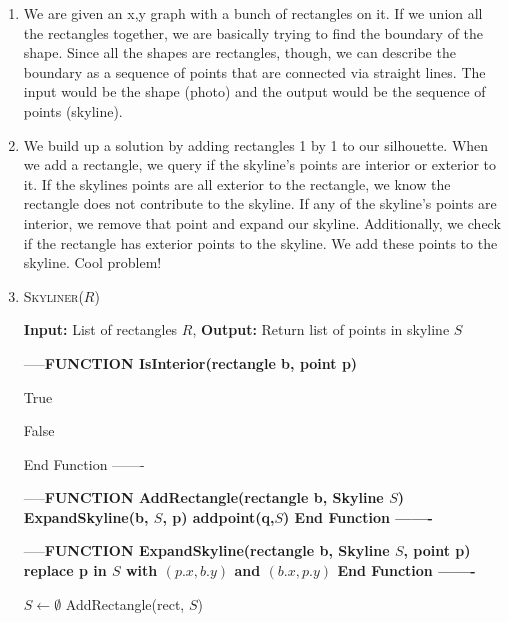 \documentclass{article}
\begin{document}
\begin{enumerate}
	\item We are given an x,y graph with a bunch of rectangles on it. If we union all the rectangles together, we are basically trying to find the boundary of the shape. Since all the shapes are rectangles, though, we can describe the boundary as a sequence of points that are connected via straight lines. The input would be the shape (photo) and the output would be the sequence of points (skyline). 
	\item We build up a solution by adding rectangles 1 by 1 to our silhouette. When we add a rectangle, we query if the skyline's points are interior or exterior to it. If the skylines points are all exterior to the rectangle, we know the rectangle does not contribute to the skyline. If any of the skyline's points are interior, we remove that point and expand our skyline. Additionally, we check if the rectangle has exterior points to the skyline. We add these points to the skyline.  Cool problem!
	\item 
\begin{algorithm}\caption{\textsc{Skyliner}($R$)}\label{alg:bs}
                        {\bf Input:} List of rectangles $R$,
                        {\bf Output:} Return list of points in skyline $S$ 
                \begin{algorithmic}[h]
			\State -----\bf{FUNCTION IsInterior(rectangle b, point p)}

		
			\State \Return True
			\EndIf
			
		
		\Else
			\State \Return False
		\EndIf

		\State End Function
			\State -------


		\State -----\bf{FUNCTION AddRectangle(rectangle b, Skyline $S$)}
			\State ExpandSkyline(b, $S$, p)
			\EndIf
			\EndFor
			\State addpoint(q,$S$)
			\EndIf
			\EndFor
	\State End Function
	\State -------

		\State -----\bf{FUNCTION ExpandSkyline(rectangle b, Skyline $S$, point p)}
			\State replace p in $S$ with $(p.x, b.y)$ and $(b.x, p.y)$
\State End Function
	\State -------




		\State $S \gets \emptyset$ 
			\State AddRectangle(rect, $S$)
			\EndFor





\end{algorithmic}
\end{algorithm}
\end{enumerate}
\end{document}
